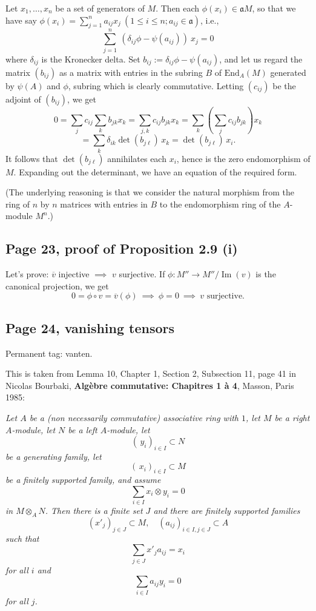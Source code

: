 \documentclass[parskip=half,fontsize=12pt]{scrartcl}%
\newcommand{\oo}{\operatorname}\newcommand{\ooo}{\operatorname*}
\newcommand{\mf}{\mathfrak}
\begin{document}
Let $x_1,\dots,x_n$ be a set of generators of $M$. Then each $\phi(x_i)\in\mf aM$, so that we have say $\phi(x_i)=\sum_{j=1}^na_{ij}x_j\ (1\le i\le n; a_{ij}\in\mf a)$, i.e., 
$$
\sum_{j=1}^n\ (\delta_{ij}\phi-\psi(a_{ij}))\ x_j=0
$$ 
where $\delta_{ij}$ is the Kronecker delta. Set $b_{ij}:=\delta_{ij}\phi-\psi(a_{ij})$, and let us regard the matrix $(b_{ij})$ as a matrix with entries in the subring $B$ of $\text{End}_A(M)$ generated by $\psi(A)$ and $\phi$, subring which is clearly commutative. Letting $(c_{ij})$ be the adjoint of $(b_{ij})$, we get 
$$
0=\sum_jc_{ij}\sum_kb_{jk}x_k=\sum_{j,k}c_{ij}b_{jk}x_k=\sum_k\left(\sum_jc_{ij}b_{jk}\right)x_k
$$ 
$$
=\sum_k\delta_{ik}\det(b_{j\ell})\,x_k=\det(b_{j\ell})\,x_i.
$$ %
It follows that $\det(b_{j\ell})$ annihilates each $x_i$, hence is the zero endomorphism of $M$. Expanding out the determinant, we have an equation of the required form.

(The underlying reasoning is that we consider the natural morphism from the ring of $n$ by $n$ matrices with entries in $B$ to the endomorphism ring of the $A$-module $M^n$.)

\subsection{Page 23, proof of Proposition 2.9 (i)}%

Let's prove: $\overline v$ injective $\implies$ $v$ surjective. If $\phi:M''\to M''/\oo{Im}(v)$ is the canonical projection, we get 
$$
0=\phi\circ v=\overline v(\phi)\ \implies\ \phi=0\ \implies\ v\text{ surjective.}
$$

\subsection{Page 24, vanishing tensors}\label{vt}%

Permanent tag: vanten.

This is taken from Lemma 10, Chapter 1, Section 2, Subsection 11, page 41 in Nicolas Bourbaki, \textbf{Algèbre commutative: Chapitres 1 à 4}, Masson, Paris 1985:

\emph{Let $A$ be a (non necessarily commutative) associative ring with $1$, let $M$ be a right $A$-module, let $N$ be a left $A$-module, let 
$$
(\,y_i)_{i\in I}\subset N
$$ 
be a generating family, let 
$$
(\,x_i)_{i\in I}\subset M
$$ 
be a finitely supported family, and assume 
$$
\sum_{i\in I}x_i\otimes y_i=0
$$ 
in $M\otimes_AN$. Then there is a finite set $J$ and there are finitely supported families 
$$
(x'_j)_{j\in J}\subset M,\quad(a_{ij})_{i\in I,j\in J}\subset A
$$ 
such that 
$$
\sum_{j\in J} x'_ja_{ij}=x_i
$$ 
for all $i$ and 
$$
\sum_{i\in I}a_{ij}y_i=0
$$ 
for all $j$.}
\end{document}
